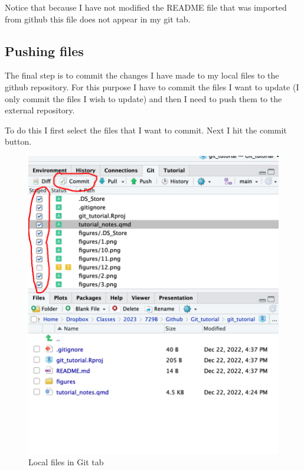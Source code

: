 \documentclass[
  letterpaper,
  DIV=11,
  numbers=noendperiod]{scrartcl}
\begin{document}
Notice that because I have not modified the README file that was
imported from github this file does not appear in my git tab.

\hypertarget{pushing-files}{%
\subsection{Pushing files}\label{pushing-files}}

The final step is to commit the changes I have made to my local files to
the github repository. For this purpose I have to commit the files I
want to update (I only commit the files I wish to update) and then I
need to push them to the external repository.

To do this I first select the files that I want to commit. Next I hit
the commit button.

\begin{figure}

{\centering \includegraphics{figures/12.PNG}

}

\caption{Local files in Git tab}

\end{figure}
\end{document}
